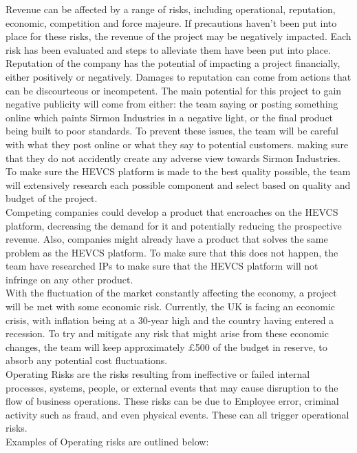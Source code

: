 \documentclass [12pt]{article}
\begin{document}
Revenue can be affected by a range of risks, including operational, reputation, economic, competition and force majeure. If precautions haven’t been put into place for these risks, the revenue of the project may be negatively impacted. Each risk has been evaluated and steps to alleviate them have been put into place.
\\
Reputation of the company has the potential of impacting a project financially, either positively or negatively. Damages to reputation can come from actions that can be discourteous or incompetent. The main potential for this project to gain negative publicity will come from either: the team saying or posting something online which paints Sirmon Industries in a negative light, or the final product being built to poor standards. To prevent these issues, the team will be careful with what they post online or what they say to potential customers. making sure that they do not accidently create any adverse view towards Sirmon Industries. To make sure the HEVCS platform is made to the best quality possible, the team will extensively research each possible component and select based on quality and budget of the project.
\\
Competing companies could develop a product that encroaches on the HEVCS platform, decreasing the demand for it and potentially reducing the prospective revenue. Also, companies might already have a product that solves the same problem as the HEVCS platform. To make sure that this does not happen, the team have researched IPs to make sure that the HEVCS platform will not infringe on any other product.
\\
With the fluctuation of the market constantly affecting the economy, a project will be met with some economic risk. Currently, the UK is facing an economic crisis, with inflation being at a 30-year high and the country having entered a recession. To try and mitigate any risk that might arise from these economic changes, the team will keep approximately £500 of the budget in reserve, to absorb any potential cost fluctuations.
\\
Operating Risks are the risks resulting from ineffective or failed internal processes, systems, people, or external events that may cause disruption to the flow of business operations. These risks can be due to Employee error, criminal activity such as fraud, and even physical events. These can all trigger operational risks.
\\
Examples of Operating risks are outlined below:
\end{document}
